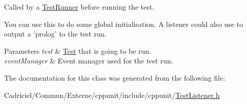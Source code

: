 Called by a \hyperlink{class_test_runner}{Test\-Runner} before running the test. 

You can use this to do some global initialisation. A listener could also use to output a 'prolog' to the test run.


\begin{DoxyParams}{Parameters}
{\em test} & \hyperlink{class_test}{Test} that is going to be run. \\
\hline
{\em event\-Manager} & Event manager used for the test run. \\
\hline
\end{DoxyParams}


The documentation for this class was generated from the following file\-:\begin{DoxyCompactItemize}
\item 
Cadriciel/\-Commun/\-Externe/cppunit/include/cppunit/\hyperlink{_test_listener_8h}{Test\-Listener.\-h}\end{DoxyCompactItemize}

